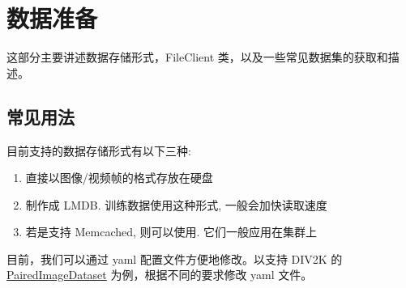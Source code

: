 \documentclass[../main.tex]{subfiles}
\begin{document}
\chapter{数据准备}\label{chapter:data_preparation}
\vspace{-2cm}
这部分主要讲述数据存储形式，FileClient 类，以及一些常见数据集的获取和描述。

\section{常见用法}\label{data_preparation:common_use}

目前支持的数据存储形式有以下三种:

\begin{enumerate}
    \item 直接以图像/视频帧的格式存放在硬盘
    \item 制作成 LMDB. 训练数据使用这种形式, 一般会加快读取速度
    \item 若是支持 Memcached, 则可以使用. 它们一般应用在集群上
\end{enumerate}

目前，我们可以通过 yaml 配置文件方便地修改。以支持 DIV2K 的 \href{https://github.com/XPixelGroup/BasicSR/blob/master/basicsr/data/paired_image_dataset.py}{PairedImageDataset} 为例，根据不同的要求修改 yaml 文件。
\end{document}
